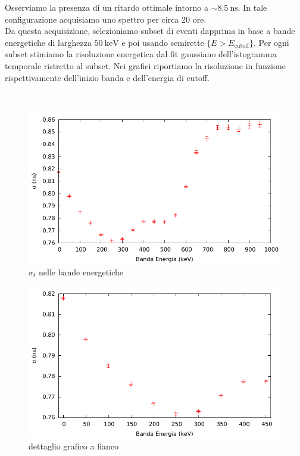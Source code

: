 \documentclass[a4paper,11pt,italian]{report}
\begin{document}
Osserviamo la presenza di un ritardo ottimale intorno a $\sim \SI{8.5}{\nano\second}$. In tale configurazione acquisiamo uno spettro per circa 20 ore.\\

Da questa acquisizione, selezioniamo subset di eventi dapprima in base a bande energetiche di larghezza $\SI{50}{\kilo\electronvolt}$ e poi usando semirette $\{ E > E_{\text{cutoff}} \}$. Per ogni subset stimiamo la risoluzione energetica dal fit gaussiano dell'istogramma temporale ristretto al subset. Nei grafici riportiamo la risoluzione in funzione rispettivamente dell'inizio banda e dell'energia di cutoff.

~\\
\begin{minipage}{0.45\linewidth}
	\centering
	\begin{figure}[H]
	\includegraphics[width=\columnwidth,keepaspectratio]{../out/Banda}
	\caption{\small{$\sigma_t$ nelle bande energetiche}}
	\end{figure}
\end{minipage}
\begin{minipage}{0.45\linewidth}
	\begin{figure}[H]
	\includegraphics[width=\columnwidth,keepaspectratio]{../out/Banda3}
	\caption{\small{dettaglio grafico a fianco}}
	\end{figure}
\end{minipage}
\end{document}
